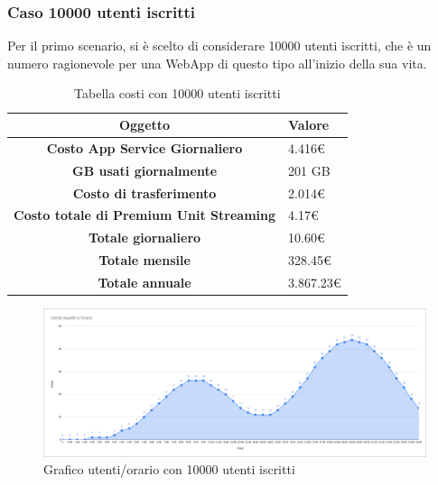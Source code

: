 \subsubsection{Caso 10000 utenti iscritti}
Per il primo scenario, si è scelto di considerare 10000 utenti iscritti, che è un numero ragionevole per una WebApp di questo tipo all'inizio della sua vita.\\
\begin{table}[H]
    \label{tab:costi-10000}
    \begin{tabularx}{\textwidth}{|c|X|}
        \hline
        \textbf{Oggetto} & \textbf{Valore} \\\hline
        
        \textbf{Costo App Service Giornaliero} & {4.416€} \\ 
        \hline
        \textbf{GB usati giornalmente} & {201 GB} \\ 
        \hline
        \textbf{Costo di trasferimento} & {2.014€}\\
        \hline
        \textbf{Costo totale di Premium Unit Streaming} & {4.17€}\\  
        \hline
        \textbf{Totale giornaliero} & {10.60€}\\  
        \hline
        \textbf{Totale mensile} & {328.45€}\\  
        \hline
        \textbf{Totale annuale} & {3.867.23€}\\  
        \hline
    \end{tabularx}
    \caption{Tabella costi con 10000 utenti iscritti}
\end{table}
\begin{figure}[H]
    \centering
    \includegraphics[scale=0.25]{images/costi/10kuser.png}
    \caption{Grafico utenti/orario con 10000 utenti iscritti}
    \label{fig:costi-10000}
\end{figure}
